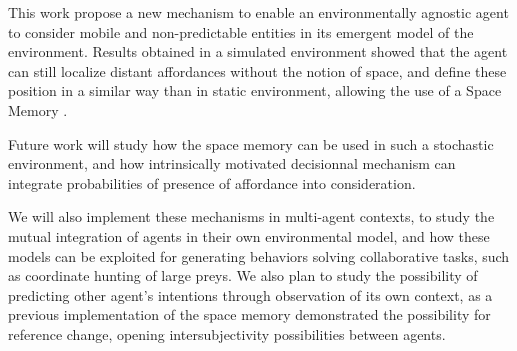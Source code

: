 \documentclass[conference]{IEEEtran}
\makeatletter
\let\cite\relax
\DeclareRobustCommand{\cite}{%
	\let\new@cite@pre\@gobble
	\@ifnextchar[\new@cite{\@citex[]}}
\def\new@cite[#1]{\@ifnextchar[{\new@citea{#1}}{\@citex[#1]}}
\def\new@citea#1{\def\new@cite@pre{#1}\@citex}
\makeatother
\begin{document}
This work propose a new mechanism to enable an environmentally agnostic agent to consider mobile and non-predictable entities in its emergent model of the environment. Results obtained in a simulated environment showed that the agent can still localize distant affordances without the notion of space, and define these position in a similar way than in static environment, allowing the use of a Space Memory \cite{gay:space}.

Future work will study how the space memory can be used in such a stochastic environment, and how intrinsically motivated decisionnal mechanism can integrate probabilities of presence of affordance into consideration.

We will also implement these mechanisms in multi-agent contexts, to study the mutual integration of agents in their own environmental model, and how these models can be exploited for generating behaviors solving collaborative tasks, such as coordinate hunting of large preys. We also plan to study the possibility of predicting other agent's intentions through observation of its own context, as a previous implementation of the space memory demonstrated the possibility for reference change, opening intersubjectivity possibilities between agents.





\end{document}
